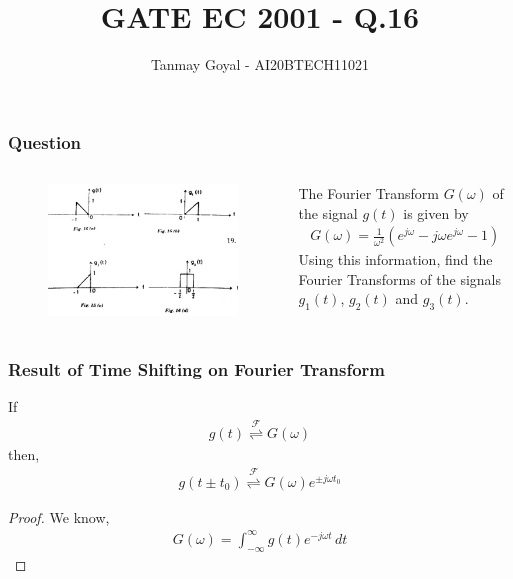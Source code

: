 \documentclass{beamer}
\title{GATE EC 2001 - Q.16}
\author{Tanmay Goyal - AI20BTECH11021}
\date{}
\providecommand{\fourier}{\overset{\mathcal{F}}{ \rightleftharpoons}}
\begin{document}
\begin{frame}
\titlepage
\end{frame}
\begin{frame}
\frametitle{Question}
\begin{flushleft} 
\begin{columns}
\begin{column}{0.5\textwidth}
\begin{figure}[!ht]
\centering
 \includegraphics[width=\columnwidth]{Question.png}
\end{figure}
\end{column}
\begin{column}{0.5\textwidth}
The Fourier Transform $G(\omega)$ of the signal $g(t)$ is given by 
\begin{align}
    G(\omega) = \frac{1}{\omega^2}(e^{j\omega} - j\omega e^{j\omega} - 1)
\end{align}
Using this information, find the Fourier Transforms of the signals $g_1(t)$, $g_2(t)$ and $g_3(t)$.
\end{column}
\end{columns}
\end{flushleft}
\end{frame}

\begin{frame}[fragile]
\frametitle{Result of Time Shifting on Fourier Transform}

\begin{flushleft}
\begin{lemma}
If 
\begin{align}
    g(t) \fourier G(\omega)
\end{align}
then,
\begin{align}
    g(t \pm t_0) \fourier G(\omega)e^{\pm j\omega t_0}
\end{align}
\label{shift}
\end{lemma} 
\begin{proof}
We know, 
\begin{align}
    G(\omega) = \int_{-\infty}^\infty g(t) e^{-j \omega t} \,dt
\end{align}
\end{proof}
\end{flushleft}
\end{frame}
\end{document}
